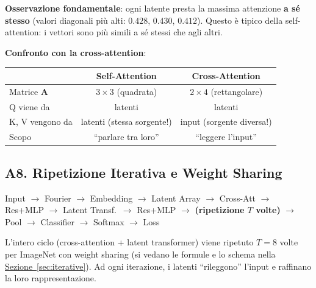 \documentclass[12pt,a4paper]{article}
\begin{document}
\begin{examplebox}
\textbf{Osservazione fondamentale}: ogni latente presta la massima attenzione \textbf{a s\'e stesso} (valori diagonali pi\`u alti: $0.428$, $0.430$, $0.412$). Questo \`e tipico della self-attention: i vettori sono pi\`u simili a s\'e stessi che agli altri.

\textbf{Confronto con la cross-attention}:
\begin{center}
\begin{tabular}{@{}lcc@{}}
\toprule
& Self-Attention & Cross-Attention \\
\midrule
Matrice $\mathbf{A}$ & $3 \times 3$ (quadrata) & $2 \times 4$ (rettangolare) \\
Q viene da & latenti & latenti \\
K, V vengono da & latenti (stessa sorgente!) & input (sorgente diversa!) \\
Scopo & ``parlare tra loro'' & ``leggere l'input'' \\
\bottomrule
\end{tabular}
\end{center}
\end{examplebox}


\subsection{A8. Ripetizione Iterativa e Weight Sharing} \label{sec:ripetizione}

\begin{pipelinebox}
Input $\to$ Fourier $\to$ Embedding $\to$ Latent Array $\to$ Cross-Att $\to$ Res+MLP $\to$ Latent Transf.\ $\to$ Res+MLP $\to$ \textbf{(ripetizione $T$ volte)} $\to$ Pool $\to$ Classifier $\to$ Softmax $\to$ Loss
\end{pipelinebox}

L'intero ciclo (cross-attention + latent transformer) viene ripetuto $T = 8$ volte per ImageNet con weight sharing (si vedano le formule e lo schema nella \hyperref[sec:iterative]{Sezione~\ref*{sec:iterative}}). Ad ogni iterazione, i latenti ``rileggono'' l'input e raffinano la loro rappresentazione.
\end{document}
